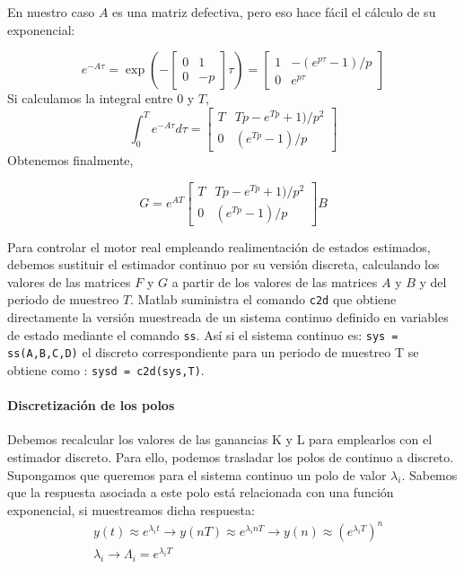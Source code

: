 \documentclass[10pt,a4paper]{report}
\begin{document}
En nuestro caso $A$ es una matriz defectiva, pero eso hace fácil el cálculo de su exponencial:

\begin{equation*}
	e^{-A\tau}=\exp\left(-\begin{bmatrix}
		0 & 1\\
		0 &-p
	\end{bmatrix}\tau\right) = \begin{bmatrix}
	1 & -(e^{p\tau}-1)/p\\
	0& e^{p\tau}
\end{bmatrix}
\end{equation*}
Si calculamos la integral entre $0$ y $T$,
\begin{equation*}
	\int_0^Te^{-A\tau}d\tau = 
	\begin{bmatrix}
		T & Tp-e^{Tp}+1)/p^2\\
		0 &(e^{Tp}-1)/p
	\end{bmatrix}
\end{equation*}
Obtenemos finalmente,

\begin{equation}
	G = e^{AT}\begin{bmatrix}
		T & Tp-e^{Tp}+1)/p^2\\
		0 &(e^{Tp}-1)/p
	\end{bmatrix}B
\end{equation}



Para controlar el motor real empleando realimentación de estados estimados, debemos sustituir el estimador continuo por su versión discreta, calculando los valores de las matrices $F$ y $G$ a partir de los valores de las matrices $A$ y $B$ y del periodo de muestreo $T$. Matlab suministra el comando \texttt{c2d} que obtiene directamente la versión muestreada de un sistema continuo definido en variables de estado mediante el comando \texttt{ss}. Así si el sistema continuo es: \texttt{sys = ss(A,B,C,D)} el discreto correspondiente para un periodo de muestreo T se obtiene como : \texttt{sysd = c2d(sys,T)}.

 

\paragraph{Discretización de los polos} Debemos recalcular los valores de las ganancias K y L para emplearlos con el estimador discreto. Para ello, podemos trasladar los polos de continuo a discreto. Supongamos que queremos para el sistema continuo un polo de valor $\lambda_i$. Sabemos que la respuesta asociada a este polo está relacionada con una función exponencial, si muestreamos dicha respuesta:
\begin{align}
&y(t) \approx e^{\lambda_it} \rightarrow y(nT) \approx e^{\lambda_inT} \rightarrow y(n) \approx \left(e^{\lambda_iT}\right)^n\\
&\lambda_i \rightarrow  \Lambda_i = e^{\lambda_iT} \label{eq416}
\end{align}
\end{document}
